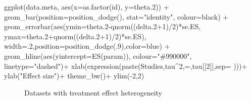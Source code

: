 \documentclass[
]{book}
\newenvironment{Shaded}{\begin{snugshade}}{\end{snugshade}}
\newcommand{\AttributeTok}[1]{\textcolor[rgb]{0.77,0.63,0.00}{#1}}
\newcommand{\DecValTok}[1]{\textcolor[rgb]{0.00,0.00,0.81}{#1}}
\newcommand{\FloatTok}[1]{\textcolor[rgb]{0.00,0.00,0.81}{#1}}
\newcommand{\FunctionTok}[1]{\textcolor[rgb]{0.00,0.00,0.00}{#1}}
\newcommand{\NormalTok}[1]{#1}
\newcommand{\SpecialCharTok}[1]{\textcolor[rgb]{0.00,0.00,0.00}{#1}}
\newcommand{\StringTok}[1]{\textcolor[rgb]{0.31,0.60,0.02}{#1}}
\theoremstyle{definition}
\theoremstyle{definition}
\theoremstyle{definition}
\theoremstyle{definition}
\theoremstyle{remark}
\begin{document}
\begin{Shaded}
\begin{Highlighting}[]
  \FunctionTok{ggplot}\NormalTok{(data.meta, }\FunctionTok{aes}\NormalTok{(}\AttributeTok{x=}\FunctionTok{as.factor}\NormalTok{(id), }\AttributeTok{y=}\NormalTok{theta}\FloatTok{.2}\NormalTok{)) }\SpecialCharTok{+}
      \FunctionTok{geom\_bar}\NormalTok{(}\AttributeTok{position=}\FunctionTok{position\_dodge}\NormalTok{(), }\AttributeTok{stat=}\StringTok{"identity"}\NormalTok{, }\AttributeTok{colour=}\StringTok{\textquotesingle{}black\textquotesingle{}}\NormalTok{) }\SpecialCharTok{+}
      \FunctionTok{geom\_errorbar}\NormalTok{(}\FunctionTok{aes}\NormalTok{(}\AttributeTok{ymin=}\NormalTok{theta}\FloatTok{.2}\SpecialCharTok{{-}}\FunctionTok{qnorm}\NormalTok{((delta}\FloatTok{.2}\SpecialCharTok{+}\DecValTok{1}\NormalTok{)}\SpecialCharTok{/}\DecValTok{2}\NormalTok{)}\SpecialCharTok{*}\NormalTok{se.ES, }\AttributeTok{ymax=}\NormalTok{theta}\FloatTok{.2}\SpecialCharTok{+}\FunctionTok{qnorm}\NormalTok{((delta}\FloatTok{.2}\SpecialCharTok{+}\DecValTok{1}\NormalTok{)}\SpecialCharTok{/}\DecValTok{2}\NormalTok{)}\SpecialCharTok{*}\NormalTok{se.ES), }\AttributeTok{width=}\NormalTok{.}\DecValTok{2}\NormalTok{,}\AttributeTok{position=}\FunctionTok{position\_dodge}\NormalTok{(.}\DecValTok{9}\NormalTok{),}\AttributeTok{color=}\StringTok{\textquotesingle{}blue\textquotesingle{}}\NormalTok{) }\SpecialCharTok{+}
      \FunctionTok{geom\_hline}\NormalTok{(}\FunctionTok{aes}\NormalTok{(}\AttributeTok{yintercept=}\FunctionTok{ES}\NormalTok{(param)), }\AttributeTok{colour=}\StringTok{"\#990000"}\NormalTok{, }\AttributeTok{linetype=}\StringTok{"dashed"}\NormalTok{)}\SpecialCharTok{+}
      \FunctionTok{xlab}\NormalTok{(}\FunctionTok{expression}\NormalTok{(}\FunctionTok{paste}\NormalTok{(}\StringTok{\textquotesingle{}Studies\textquotesingle{}}\NormalTok{,tau}\SpecialCharTok{\^{}}\DecValTok{2}\NormalTok{,}\StringTok{\textquotesingle{}=\textquotesingle{}}\NormalTok{,tau[[}\DecValTok{2}\NormalTok{]],}\AttributeTok{sep=}\StringTok{\textquotesingle{} \textquotesingle{}}\NormalTok{)))}\SpecialCharTok{+}
      \FunctionTok{ylab}\NormalTok{(}\StringTok{"Effect size"}\NormalTok{)}\SpecialCharTok{+}
      \FunctionTok{theme\_bw}\NormalTok{()}\SpecialCharTok{+}
      \FunctionTok{ylim}\NormalTok{(}\SpecialCharTok{{-}}\DecValTok{2}\NormalTok{,}\DecValTok{2}\NormalTok{)}
\end{Highlighting}
\end{Shaded}

\begin{figure}[htbp]

{\centering {}

}

\caption{Datasets with treatment effect heterogeneity}\label{fig:metanoiseplot}
\end{figure}
\end{document}
